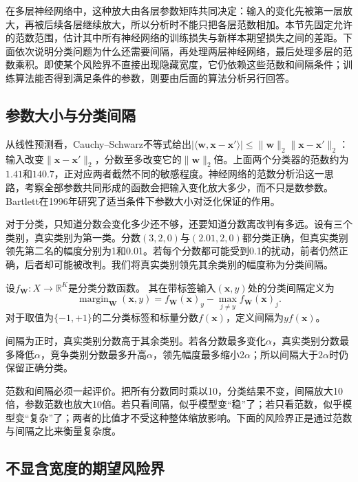 在多层神经网络中，这种放大由各层参数矩阵共同决定：输入的变化先被第一层放大，再被后续各层继续放大，所以分析时不能只把各层范数相加。本节先固定允许的范数范围，估计其中所有神经网络的训练损失与新样本期望损失之间的差距。下面依次说明分类问题为什么还需要间隔，再处理两层神经网络，最后处理多层的范数乘积。即使某个风险界不直接出现隐藏宽度，它仍依赖这些范数和间隔条件；训练算法能否得到满足条件的参数，则要由后面的算法分析另行回答。

\subsection{参数大小与分类间隔}

从线性预测看，Cauchy--Schwarz不等式给出$|\langle\bm w,\bm x-\bm x'\rangle|\leq\|\bm w\|_2\|\bm x-\bm x'\|_2$：输入改变$\|\bm x-\bm x'\|_2$，分数至多改变它的$\|\bm w\|_2$倍。上面两个分类器的范数约为$1.41$和$140.7$，正对应两者截然不同的敏感程度。神经网络的范数分析沿这一思路，考察全部参数共同形成的函数会把输入变化放大多少，而不只是数参数。Bartlett在1996年研究了适当条件下参数大小对泛化保证的作用。

对于分类，只知道分数会变化多少还不够，还要知道分数离改判有多远。设有三个类别，真实类别为第一类。分数$(3,2,0)$与$(2.01,2,0)$都分类正确，但真实类别领先第二名的幅度分别为1和0.01。若每个分数都可能受到0.1的扰动，前者仍然正确，后者却可能被改判。我们将真实类别领先其余类别的幅度称为分类间隔。

\begin{definition}[分类间隔]
\label{def:network-margin}
设$f_{\bm W}:X\to\mathbb R^K$是分类分数函数。
其在带标签输入$(\bm x,y)$处的分类间隔定义为
\begin{equation}
 \operatorname{margin}_{\bm W}(\bm x,y)
 =f_{\bm W}(\bm x)_y-\max_{j\neq y}f_{\bm W}(\bm x)_j.
 \label{eq:network-margin}
\end{equation}
对于取值为$\{-1,+1\}$的二分类标签和标量分数$f(\bm x)$，定义间隔为$yf(\bm x)$。
\end{definition}

间隔为正时，真实类别分数高于其余类别。若各分数最多变化$\alpha$，真实类别分数最多降低$\alpha$，竞争类别分数最多升高$\alpha$，领先幅度最多缩小$2\alpha$；所以间隔大于$2\alpha$时仍保留正确分类。

范数和间隔必须一起评价。把所有分数同时乘以10，分类结果不变，间隔放大10倍，参数范数也放大10倍。若只看间隔，似乎模型变“稳”了；若只看范数，似乎模型变“复杂”了；两者的比值才不受这种整体缩放影响。下面的风险界正是通过范数与间隔之比来衡量复杂度。

\subsection{不显含宽度的期望风险界}

